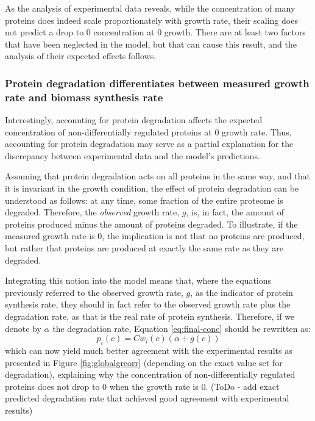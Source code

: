 \documentclass[notitlepage]{article}
\begin{document}
As the analysis of experimental data reveals, while the concentration of many proteins does indeed scale proportionately with growth rate, their scaling does not predict a drop to 0 concentration at 0 growth.
There are at least two factors that have been neglected in the model, but that can cause this result, and the analysis of their expected effects follows.

\subsubsection{Protein degradation differentiates between measured growth rate and biomass synthesis rate}
Interestingly, accounting for protein degradation affects the expected concentration of non-differentially regulated proteins at 0 growth rate.
Thus, accounting for protein degradation may serve as a partial explanation for the discrepancy between experimental data and the model's predictions.

Assuming that protein degradation acts on all proteins in the same way, and that it is invariant in the growth condition, the effect of protein degradation can be understood as follows: at any time, some fraction of the entire proteome is degraded.
Therefore, the \emph{observed} growth rate, $g$, is, in fact, the amount of proteins produced minus the amount of proteins degraded.
To illustrate, if the measured growth rate is 0, the implication is not that no proteins are produced, but rather that proteins are produced at exactly the same rate as they are degraded.

Integrating this notion into the model means that, where the equations previously referred to the observed growth rate, $g$, as the indicator of protein synthesis rate, they should in fact refer to the observed growth rate plus the degradation rate, as that is the real rate of protein synthesis.
Therefore, if we denote by $\alpha$ the degradation rate, Equation \ref{eq:final-conc} should be rewritten as:
\begin{equation}
  \label{eq:final-conc-deg}
  p_i(c)=Cw_i(c)(\alpha+g(c))
\end{equation}
which can now yield much better agreement with the experimental results as presented in Figure \ref{fig:globalgrcorr} (depending on the exact value set for degradation), explaining why the concentration of non-differentially regulated proteins does not drop to 0 when the growth rate is 0.
(ToDo - add exact predicted degradation rate that achieved good agreement with experimental results)
\end{document}
